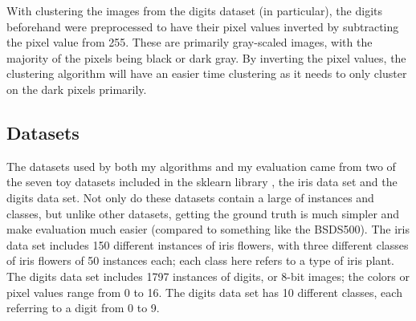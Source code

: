 \documentclass[10pt,twocolumn]{article}
\begin{document}

With clustering the images from the digits dataset (in particular), the digits beforehand were preprocessed to have their pixel values inverted by subtracting the pixel value from 255. These are primarily gray-scaled images, with the majority of the pixels being black or dark gray. By inverting the pixel values, the clustering algorithm will have an easier time clustering as it needs to only cluster on the dark pixels primarily.

\subsection {Datasets}

The datasets used by both my algorithms and my evaluation came from two of the seven toy datasets included in the sklearn library \cite{skLearn2020}, the iris data set and the digits data set. Not only do these datasets contain a large of instances and classes, but unlike other datasets, getting the ground truth is much simpler and make evaluation much easier (compared to something like the BSDS500). The iris data set includes 150 different instances of iris flowers, with three different classes of iris flowers of 50 instances each; each class here refers to a type of iris plant. The digits data set includes 1797 instances of digits, or 8-bit images; the colors or pixel values range from 0 to 16. The digits data set has 10 different classes, each referring to a digit from 0 to 9. 
\end{document}

